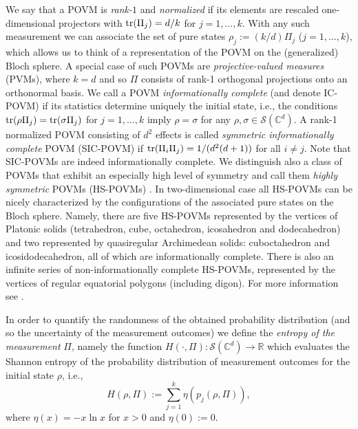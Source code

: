 \documentclass[11pt]{article}
\theoremstyle{remark}
\theoremstyle{definition}
\def\tr{\textnormal{tr}}
\begin{document}
We say that a POVM is \emph{rank-$1$} and \emph{normalized} if its elements are rescaled one-dimensional projectors with $\tr(\Pi_j)=d/k$ for $j=1,\ldots,k$. With any such measurement we can associate the set of pure states $\rho_j:=(k/d)\Pi_j$ ($j=1,\ldots,k$), which allows us to think of a representation of the POVM on the (generalized) Bloch sphere. A special case of such POVMs are \emph{projective-valued measures} (PVMs), where $k=d$ and so $\Pi$ consists of rank-1 orthogonal projections onto an orthonormal basis. We call a POVM \emph{informationally complete} (and denote IC-POVM) if its statistics determine uniquely the initial state, i.e., the conditions $\tr(\rho\Pi_j)=\tr(\sigma\Pi_j)$ for $j=1,\ldots,k$ imply $\rho=\sigma$ for any $\rho,\sigma\in\mathcal S(\mathbb C^d)$. A rank-1 normalized POVM consisting of $d^2$ effects is called \emph{symmetric informationally complete} POVM (SIC-POVM) if $\tr(\Pi_i\Pi_j)=1/(d^2(d+1))$ for all \mbox{$i\neq j$}. Note that SIC-POVMs are indeed informationally complete. We distinguish also a class of POVMs that exhibit an especially high level of symmetry and call them  \emph{highly symmetric} POVMs (HS-POVMs) \cite{SloSzy16}. In two-dimensional case all HS-POVMs can be nicely characterized by the configurations of the associated pure states on the Bloch sphere. Namely, there are five HS-POVMs represented by the vertices of Platonic solids (tetrahedron, cube, octahedron, icosahedron and dodecahedron) and two represented by quasiregular Archimedean solids: cuboctahedron and icosidodecahedron, all of which are informationally complete. There is also an infinite series of non-informationally complete HS-POVMs, represented by the vertices of regular equatorial polygons (including digon). For more information see \cite{SloSzy16}. 

In order to quantify the randomness of the obtained probability distribution (and so the uncertainty of the measurement outcomes) we define the \emph{entropy of the measurement} $\Pi$, namely the function $H(\cdot,\Pi):\mathcal S(\mathbb C^d)\to\mathbb R$ which evaluates the Shannon entropy of the probability distribution of measurement outcomes for the initial state $\rho$, i.e.,
$$H(\rho,\Pi):=\sum_{j=1}^k\eta(p_j(\rho,\Pi)),$$
where $\eta(x)=-x\ln x$ for $x>0$ and $\eta(0):=0$. 
\end{document}
